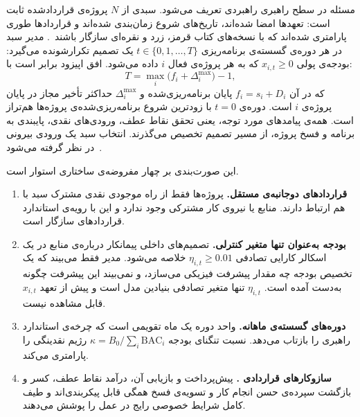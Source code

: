مسئله در سطح راهبری راهبردی تعریف می‌شود. سبدی از $N$ پروژه‌ی
قراردادشده ثابت است: تعهدها امضا شده‌اند، تاریخ‌های شروع زمان‌بندی
شده‌اند و قراردادها طوری پارامتری شده‌اند که با نسخه‌های کتاب قرمز،
زرد و نقره‌ای  سازگار باشند~\citep{FIDIC2017}. مدیر سبد در هر
دوره‌ی گسسته‌ی برنامه‌ریزی $t \in \{0, 1, \ldots, T\}$ یک تصمیم
تکرارشونده می‌گیرد: بودجه‌ی پولی $x_{i,t} \geq 0$ که به هر پروژه‌ی
فعال $i$ داده می‌شود. افق اپیزود برابر است با:
\begin{equation}
  T = \max_{i} \bigl(f_i + \Delta^{\max}_i\bigr) - 1,
  \label{eq:horizon}
\end{equation}
که در آن $f_i = s_i + D_i$ پایان برنامه‌ریزی‌شده و $\Delta^{\max}_i$
حداکثر تأخیر مجاز در پایان پروژه‌ی $i$ است. دوره‌ی $t=0$ با زودترین
شروع برنامه‌ریزی‌شده‌ی پروژه‌ها هم‌تراز است. همه‌ی پیامدهای مورد توجه،
یعنی تحقق نقاط عطف، ورودی‌های نقدی، پایبندی به برنامه و فسخ پروژه، از
مسیر تصمیم تخصیص می‌گذرند. انتخاب سبد یک ورودی بیرونی در نظر گرفته
می‌شود~\citep{Archer1999}.

این صورت‌بندی بر چهار مفروضه‌ی ساختاری استوار است.

\begin{enumerate}[label=(\roman*)]
  \item \textbf{قراردادهای دوجانبه‌ی مستقل.} پروژه‌ها فقط از راه موجودی
    نقدی مشترک سبد با هم ارتباط دارند. منابع یا نیروی کار مشترکی وجود
    ندارد و این با رویه‌ی استاندارد قراردادهای  سازگار است.

  \item \textbf{بودجه به‌عنوان تنها متغیر کنترلی.} تصمیم‌های داخلی
    پیمانکار درباره‌ی منابع در یک اسکالر کارایی تصادفی
    $\eta_{i,t} \geq 0.01$ خلاصه می‌شود. مدیر فقط می‌بیند که یک تخصیص
    بودجه چه مقدار پیشرفت فیزیکی می‌سازد، و نمی‌بیند این پیشرفت چگونه
    به‌دست آمده است. $\eta_{i,t}$ تنها متغیر تصادفی بنیادین مدل است و
    پیش از تعهد $x_{i,t}$ قابل مشاهده نیست.

  \item \textbf{دوره‌های گسسته‌ی ماهانه.} واحد دوره یک ماه تقویمی است که
    چرخه‌ی استاندارد راهبری را بازتاب می‌دهد. نسبت تنگنای بودجه
    $\kappa = B_0 / \sum_i \mathrm{BAC}_i$ رژیم نقدینگی را پارامتری
    می‌کند.

  \item \textbf{سازوکارهای قراردادی .} پیش‌پرداخت و بازیابی آن،
    درآمد نقاط عطف، کسر و بازگشت سپرده‌ی حسن انجام کار و تسویه‌ی فسخ
    همگی قابل پیکربندی‌اند و طیف کامل شرایط خصوصی رایج در عمل را پوشش
    می‌دهند.
\end{enumerate}

